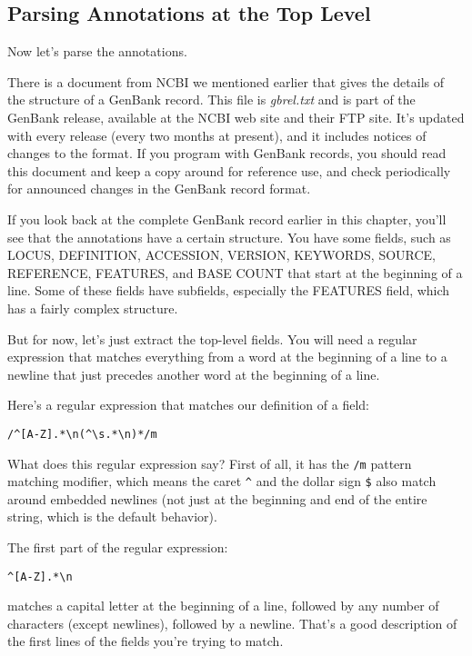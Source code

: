 \subsection{Parsing Annotations at the Top Level}
Now let's parse the annotations.

There is a document from NCBI we mentioned earlier that gives the details of the structure of a GenBank record. This file is \textit{gbrel.txt} and is part of the GenBank release, available at the NCBI web site and their FTP site. It's updated with every release (every two months at present), and it includes notices of changes to the format. If you program with GenBank records, you should read this document and keep a copy around for reference use, and check periodically for announced changes in the GenBank record format.

If you look back at the complete GenBank record earlier in this chapter, you'll see that the annotations have a certain structure. You have some fields, such as LOCUS, DEFINITION, ACCESSION, VERSION, KEYWORDS, SOURCE, REFERENCE, FEATURES, and BASE COUNT that start at the beginning of a line. Some of these fields have subfields, especially the FEATURES field, which has a fairly complex structure.

But for now, let's just extract the top-level fields. You will need a regular expression that matches everything from a word at the beginning of a line to a newline that just precedes another word at the beginning of a line.

Here's a regular expression that matches our definition of a field:

\begin{lstlisting}
/^[A-Z].*\n(^\s.*\n)*/m
\end{lstlisting}

What does this regular expression say? First of all, it has the \verb|/m| pattern matching modifier, which means the caret \verb|^| and the dollar sign \verb|$| also match around embedded newlines (not just at the beginning and end of the entire string, which is the default behavior).

The first part of the regular expression:
  
\begin{lstlisting}
^[A-Z].*\n
\end{lstlisting}

matches a capital letter at the beginning of a line, followed by any number of characters (except newlines), followed by a newline. That's a good description of the first lines of the fields you're trying to match.

